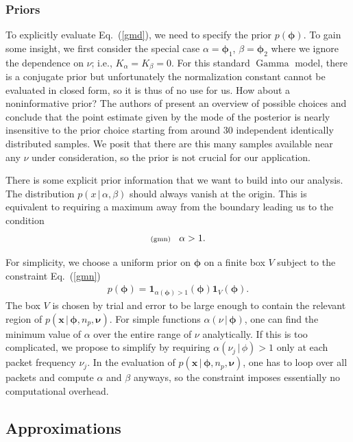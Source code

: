 \documentclass[11pt]{article}
\newcommand{\lleq}[1]{\label{#1} }
\renewcommand{\lleq}[1]{\label{#1} {\scriptstyle {\rm (#1)}} \hspace*{2ex} }
\newcommand{\cond}{\,|\,}
\newcommand{\bmx}{{{\bm{x}}}}
\newcommand{\bmphi}{{\bm{\phi}}}
\newcommand{\bmnu}{{\bm{\nu}}}
\newcommand{\refeq}[1]{Eq.~(\ref{#1})}
\DeclareMathOperator{\GammaDist}{Gamma}
\newcommand{\Kalpha}{{K_\alpha}}
\newcommand{\Kbeta}{{K_\beta}}
\newcommand{\npack}{n_p}
\begin{document}
\subsubsection*{Priors} \label{sec:priors}

To explicitly evaluate \refeq{gmd}, we need to specify the prior
$p(\bmphi)$. To gain some insight, we first consider the special case
$\alpha = \bmphi_1$, $\beta = \bmphi_2$ where we ignore the dependence
on $\nu$; i.e., $\Kalpha = \Kbeta = 0$. For this standard $\GammaDist$
model, there is a conjugate prior but unfortunately the normalization
constant cannot be evaluated in closed form, so it is thus of no use
for us. How about a noninformative prior? The authors of
\cite{moala2013bayesian} present an overview of possible choices and
conclude that the point estimate given by the mode of the posterior is
nearly insensitive to the prior choice starting from around 30
independent identically distributed samples. We posit that there are
this many samples available near any $\nu$ under consideration, so the
prior is not crucial for our application.

There is some explicit prior information that we want to build into
our analysis. The distribution $p(x \cond \alpha, \beta)$ should
always vanish at the origin. This is equivalent to requiring a maximum
away from the boundary leading us to the condition
\begin{align}
  \lleq{gmn}
  \alpha > 1.
\end{align}

For simplicity, we choose a uniform prior on $\bmphi$ on a finite box $V$ subject to the constraint \refeq{gmn}
\begin{align}
  p(\bmphi) = \mathbf{1}_{\alpha(\bmphi) > 1}(\bmphi) \mathbf{1}_V(\bmphi).
\end{align}
The box $V$ is chosen by trial and error to be large enough to contain
the relevant region of $p(\bmx\cond \bmphi, \npack, \bmnu)$. For
simple functions $\alpha(\nu \cond \bmphi)$, one can find the minimum
value of $\alpha$ over the entire range of $\nu$ analytically. If this
is too complicated, we propose to simplify by requiring $\alpha(\nu_j
\cond \phi) > 1$ only at each packet frequency $\nu_j$. In the
evaluation of $p(\bmx \cond \bmphi, \npack, \bmnu)$, one has to loop
over all packets and compute $\alpha$ and $\beta$ anyways, so the
constraint imposes essentially no computational overhead.

\subsection{Approximations}
\end{document}
